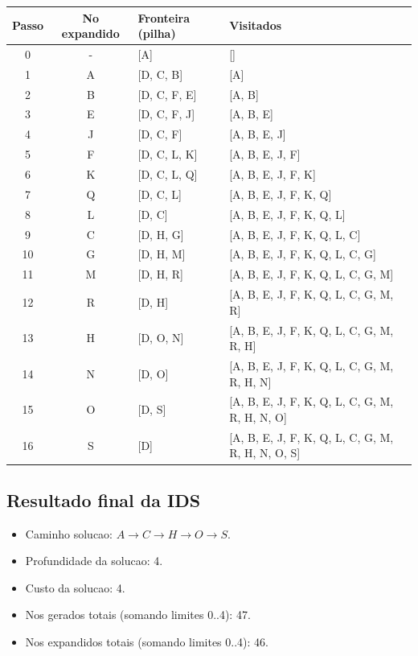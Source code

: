 \begingroup
\footnotesize
\setlength{\tabcolsep}{4pt}
\renewcommand{\arraystretch}{1.15}
\begin{longtable}{c c p{4.9cm} p{5.9cm}}
\toprule
Passo & No expandido & Fronteira (pilha) & Visitados \\
\midrule
0 & - & [A] & [] \\
1 & A & [D, C, B] & [A] \\
2 & B & [D, C, F, E] & [A, B] \\
3 & E & [D, C, F, J] & [A, B, E] \\
4 & J & [D, C, F] & [A, B, E, J] \\
5 & F & [D, C, L, K] & [A, B, E, J, F] \\
6 & K & [D, C, L, Q] & [A, B, E, J, F, K] \\
7 & Q & [D, C, L] & [A, B, E, J, F, K, Q] \\
8 & L & [D, C] & [A, B, E, J, F, K, Q, L] \\
9 & C & [D, H, G] & [A, B, E, J, F, K, Q, L, C] \\
10 & G & [D, H, M] & [A, B, E, J, F, K, Q, L, C, G] \\
11 & M & [D, H, R] & [A, B, E, J, F, K, Q, L, C, G, M] \\
12 & R & [D, H] & [A, B, E, J, F, K, Q, L, C, G, M, R] \\
13 & H & [D, O, N] & [A, B, E, J, F, K, Q, L, C, G, M, R, H] \\
14 & N & [D, O] & [A, B, E, J, F, K, Q, L, C, G, M, R, H, N] \\
15 & O & [D, S] & [A, B, E, J, F, K, Q, L, C, G, M, R, H, N, O] \\
16 & S & [D] & [A, B, E, J, F, K, Q, L, C, G, M, R, H, N, O, S] \\
\bottomrule
\end{longtable}
\endgroup

\subsection{Resultado final da IDS}
\begin{itemize}[leftmargin=1.5em]
  \item Caminho solucao: $A \rightarrow C \rightarrow H \rightarrow O \rightarrow S$.
  \item Profundidade da solucao: 4.
  \item Custo da solucao: 4.
  \item Nos gerados totais (somando limites 0..4): 47.
  \item Nos expandidos totais (somando limites 0..4): 46.
\end{itemize}

